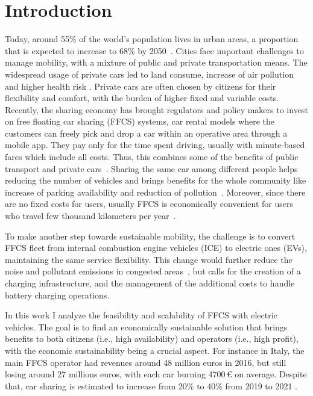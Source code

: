 \section{Introduction}
\label{sec:10_1_intro}

Today, around 55\% of the world’s population lives in urban areas, a proportion that is expected to increase to 68\% by 2050~\cite{UNfuture}.
Cities face important challenges to manage mobility, with a mixture of public and private transportation means. 
The widespread usage of private cars led to land consume, increase of air pollution and higher health risk \cite{3_kent2014carsharing}.
Private cars are often chosen by citizens for their flexibility and comfort, with the burden of higher fixed %
and variable costs. %
Recently, the sharing economy has brought regulators and policy makers to invest on free floating car sharing (FFCS) systems, car rental models where the customers can freely pick and drop a car within an operative area through a mobile app. They pay only for the time spent driving, usually with minute-based fares which include all costs. Thus, this combines some of the benefits of public transport and private cars~\cite{2_huwer2004public}. 
Sharing the same car among different people helps reducing the number of vehicles and brings benefits for the whole community like increase of parking availability and reduction of pollution~\cite{12_martin2011greenhouse}.  
Moreover, since there are no fixed costs for users, usually FFCS is economically convenient for users who travel few thousand kilometers per year~\cite{1_litman2000evaluating}. 


To make another step towards sustainable mobility, the challenge is to convert FFCS fleet from internal combustion engine vehicles (ICE) to electric ones (EVs), maintaining the same service flexibility. This change would further reduce the noise and pollutant emissions in congested areas~\cite{25_ev_benefits}, but calls for the creation of a charging infrastructure, and the management of the additional costs to handle battery charging operations.

In this work I analyze the feasibility and scalability of FFCS with electric vehicles. The goal is to find an economically sustainable solution that brings benefits to both citizens (i.e., high availability) and operators (i.e., high profit), with the economic sustainability being a crucial aspect. For instance in Italy, the main FFCS operator had revenues around 48 million euros in 2016, but still losing around 27 millions euros, with each car burning 4700\,€ on average\cite{Quattroruote}.
Despite that, car sharing is estimated to increase from 20\% to 40\% from 2019 to 2021 \cite{soleCarSharing}. %

